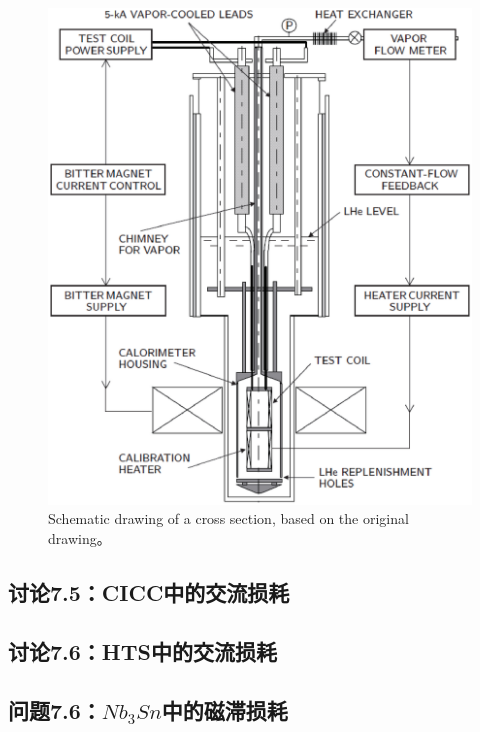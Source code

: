 \begin{figure}[htbp]
	\centering
	\includegraphics[scale=0.7]{chpt7/figs/fig7.19.eps}
	\caption{Schematic drawing of a cross section, based on the original drawing。}
\end{figure}


\subsection{讨论7.5：CICC中的交流损耗}



\subsection{讨论7.6：HTS中的交流损耗}




\subsection{问题7.6：$Nb_3Sn$中的磁滞损耗}

